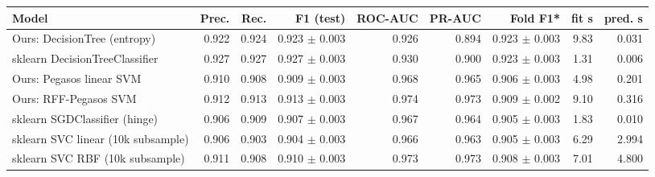\begin{tabular}{@{}lrrrrrrrr@{}}
\toprule
Model & Prec. & Rec. & F1 (test) & ROC-AUC & PR-AUC & Fold F1* & fit s & pred. s \\
\midrule
Ours: DecisionTree (entropy) & 0.922 & 0.924 & 0.923 $\pm$ 0.003 & 0.926 & 0.894 & 0.923 $\pm$ 0.003 & 9.83 & 0.031 \\
sklearn DecisionTreeClassifier & 0.927 & 0.927 & 0.927 $\pm$ 0.003 & 0.930 & 0.900 & 0.923 $\pm$ 0.003 & 1.31 & 0.006 \\
Ours: Pegasos linear SVM & 0.910 & 0.908 & 0.909 $\pm$ 0.003 & 0.968 & 0.965 & 0.906 $\pm$ 0.003 & 4.98 & 0.201 \\
Ours: RFF-Pegasos SVM & 0.912 & 0.913 & 0.913 $\pm$ 0.003 & 0.974 & 0.973 & 0.909 $\pm$ 0.002 & 9.10 & 0.316 \\
sklearn SGDClassifier (hinge) & 0.906 & 0.909 & 0.907 $\pm$ 0.003 & 0.967 & 0.964 & 0.905 $\pm$ 0.003 & 1.83 & 0.010 \\
sklearn SVC linear (10k subsample) & 0.906 & 0.903 & 0.904 $\pm$ 0.003 & 0.966 & 0.963 & 0.905 $\pm$ 0.003 & 6.29 & 2.994 \\
sklearn SVC RBF (10k subsample) & 0.911 & 0.908 & 0.910 $\pm$ 0.003 & 0.973 & 0.973 & 0.908 $\pm$ 0.003 & 7.01 & 4.800 \\
\bottomrule
\end{tabular}
